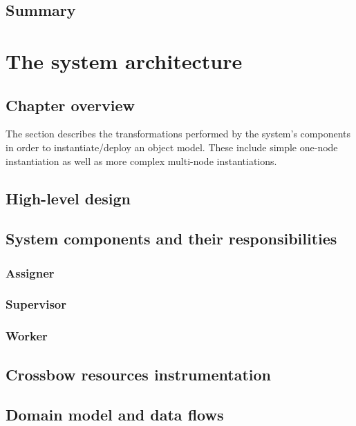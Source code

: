 \documentclass[11pt]{book}
\begin{document}
    \section*{Summary}
	


  \chapter{The system architecture}

    \section*{Chapter overview}

      The  section describes the transformations performed by the system's components in order to instantiate/deploy an object model. These include simple one-node instantiation as well as more complex multi-node instantiations.



    \section{High-level design}


    \section{System components and their responsibilities}

      \subsection{Assigner}

      \subsection{Supervisor}

      \subsection{Worker}


    \section{Crossbow resources instrumentation}


    \section{Domain model and data flows} \label{sec:domain-model}
\end{document}
